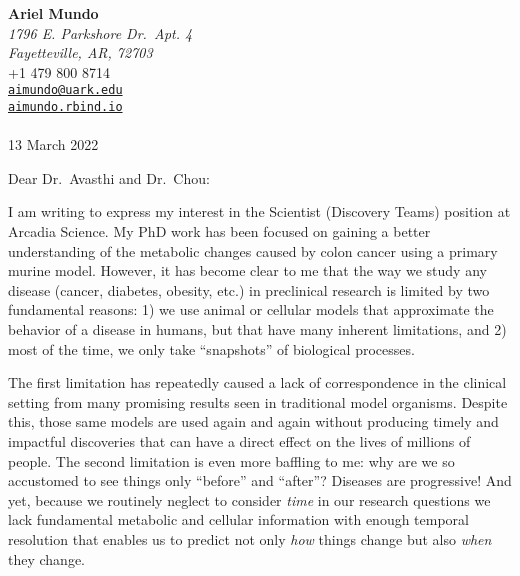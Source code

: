 \documentclass[
  11pt,
]{article}
\author{Ariel Mundo}
\date{13 March 2022}
\date{}
\begin{document}
\hfill
\begin{minipage}[t]{1\textwidth}
\raggedleft%
{\bfseries Ariel Mundo }\\[.35ex]
\emph{\small 1796 E. Parkshore Dr.~Apt. 4\\
Fayetteville, AR, 72703} \\[.35ex]
\faPhone \hspace{1 mm} \small{+1 479 800 8714} \\ 
\faEnvelopeO \hspace{1 mm} \small{\tt \href{mailto:aimundo@uark.edu}{\nolinkurl{aimundo@uark.edu}}} \\ 
\faGlobe \hspace{1 mm} \small{\href{http://aimundo.rbind.io}{\tt aimundo.rbind.io}}\\ 
\hspace{1cm} \\
 13 March 2022 \\ 
\end{minipage}


\vspace*{1em}

Dear Dr.~Avasthi and Dr.~Chou:

\vspace*{1em}

 

% 
% 

% 
I am writing to express my interest in the Scientist (Discovery Teams)
position at Arcadia Science. My PhD work has been focused on gaining a
better understanding of the metabolic changes caused by colon cancer
using a primary murine model. However, it has become clear to me that
the way we study any disease (cancer, diabetes, obesity, etc.) in
preclinical research is limited by two fundamental reasons: 1) we use
animal or cellular models that approximate the behavior of a disease in
humans, but that have many inherent limitations, and 2) most of the
time, we only take ``snapshots'' of biological processes.

The first limitation has repeatedly caused a lack of correspondence in
the clinical setting from many promising results seen in traditional
model organisms. Despite this, those same models are used again and
again without producing timely and impactful discoveries that can have a
direct effect on the lives of millions of people. The second limitation
is even more baffling to me: why are we so accustomed to see things only
``before'' and ``after''? Diseases are progressive! And yet, because we
routinely neglect to consider \emph{time} in our research questions we
lack fundamental metabolic and cellular information with enough temporal
resolution that enables us to predict not only \emph{how} things change
but also \emph{when} they change.
\end{document}
